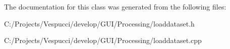 The documentation for this class was generated from the following files\+:\begin{DoxyCompactItemize}
\item 
C\+:/\+Projects/\+Vespucci/develop/\+G\+U\+I/\+Processing/loaddataset.\+h\item 
C\+:/\+Projects/\+Vespucci/develop/\+G\+U\+I/\+Processing/loaddataset.\+cpp\end{DoxyCompactItemize}
